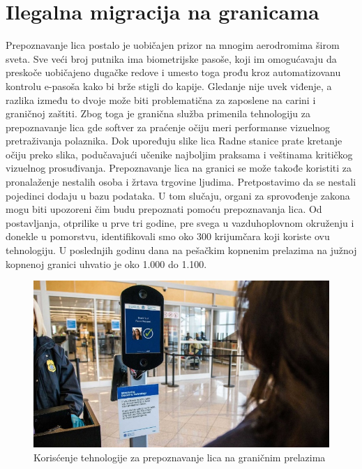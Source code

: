 \documentclass[a4paper]{article}
\begin{document}
\section{Ilegalna migracija na granicama}
\label{sec:ilegalne migracije}
Prepoznavanje lica postalo je uobičajen prizor na mnogim aerodromima širom sveta. Sve veći broj putnika ima biometrijske pasoše, koji im omogućavaju da preskoče uobičajeno dugačke redove i umesto toga prođu kroz automatizovanu kontrolu e-pasoša kako bi brže stigli do kapije.
Gledanje nije uvek viđenje, a razlika između to dvoje može biti problematična za zaposlene na carini i graničnoj zaštiti. Zbog toga je granična služba primenila tehnologiju za prepoznavanje lica gde softver za praćenje očiju meri performanse vizuelnog pretraživanja polaznika. Dok upoređuju slike lica Radne stanice prate kretanje očiju preko slika, podučavajući učenike najboljim praksama i veštinama kritičkog vizuelnog prosuđivanja. 
Prepoznavanje lica na granici se može takođe koristiti za pronalaženje nestalih osoba i žrtava trgovine ljudima. Pretpostavimo da se nestali pojedinci dodaju u bazu podataka. U tom slučaju, organi za sprovođenje zakona mogu biti upozoreni čim budu prepoznati pomoću prepoznavanja lica.
Od postavljanja, otprilike u prve tri godine, pre svega u vazduhoplovnom okruženju i donekle u pomorstvu, identifikovali smo oko 300 krijumčara koji koriste ovu tehnologiju. U poslednjih godinu dana na pešačkim kopnenim prelazima na južnoj kopnenoj granici uhvatio je oko 1.000 do 1.100.
\begin{figure}[h!]
	\begin{center}
		\includegraphics[scale=0.8]{image3.png}
	\end{center}
	\caption{Korisćenje tehnologije za prepoznavanje lica na graničnim prelazima}
\end{figure}
\end{document}
